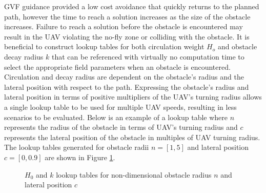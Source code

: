 \documentclass[conf]{new-aiaa}
\begin{document}
GVF guidance provided a low cost avoidance that quickly returns to the planned path, however the time to reach a solution increases as the size of the obstacle increases. Failure to reach a solution before the obstacle is encountered may result in the UAV violating the no-fly zone or colliding with the obstacle. It is beneficial to construct lookup tables for both circulation weight $H_o$ and obstacle decay radius $k$ that can be referenced with virtually no computation time to select the appropriate field parameters when an obstacle is encountered. Circulation and decay radius are dependent on the obstacle's radius and the lateral position with respect to the path. Expressing the obstacle's radius and lateral position in terms of positive multipliers of the UAV's turning radius allows a single lookup table to be used for multiple UAV speeds, resulting in less scenarios to be evaluated. Below is an example of a lookup table where $n$ represents the radius of the obstacle in terms of UAV's turning radius and $c$ represents the lateral position of the obstacle in multiples of UAV turning radius. The lookup tables generated for obstacle radii $n = [1,5]$ and lateral position $c = [0,0.9]$ are shown in Figure \ref{fig:lookupTables}.


\begin{figure}[H]
	\begin{subfigmatrix}{2}%
		\centering	
		\hspace*{0mm}
	\end{subfigmatrix}
	\caption{$H_0$ and $k$ lookup tables for non-dimensional obstacle radius $n$ and lateral position $c$}
	\label{fig:lookupTables}
\end{figure}
\end{document}
